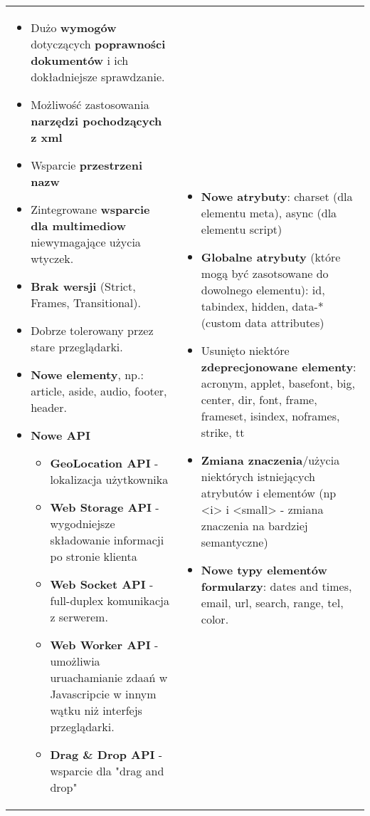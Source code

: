 \documentclass[../main.tex]{subfiles}
\begin{document}
    \begin{table}[H]
        \begin{center}
            \begin{tabular}{p{8cm} p{8cm}}
                \begin{itemize}
                    \item Dużo \textbf{wymogów} dotyczących \textbf{poprawności dokumentów} i ich dokładniejsze sprawdzanie.
                    \item Możliwość zastosowania \textbf{narzędzi pochodzących z xml}
                    \item Wsparcie \textbf{przestrzeni nazw}
                    \item Zintegrowane \textbf{wsparcie dla multimediow} niewymagające użycia wtyczek.
                    \item \textbf{Brak wersji} (Strict, Frames, Transitional).
                    \item Dobrze tolerowany przez stare przeglądarki.
                    \item \textbf{Nowe elementy}, np.: article, aside, audio, footer, header.

                    \item \textbf{Nowe API}
                    \begin{itemize}
                        \item \textbf{GeoLocation API} - lokalizacja użytkownika
                        \item \textbf{Web Storage API} - wygodniejsze składowanie informacji po stronie klienta
                        \item \textbf{Web Socket API} - full-duplex komunikacja z serwerem.
                        \item \textbf{Web Worker API} - umożliwia uruachamianie zdaań w Javascripcie w innym wątku niż interfejs przeglądarki.
                        \item \textbf{Drag \& Drop API} - wsparcie dla "drag and drop"
                    \end{itemize}
                \end{itemize}
                &
                \begin{itemize}
                    \item \textbf{Nowe atrybuty}: charset (dla elementu meta), async (dla elementu script)
                    \item \textbf{Globalne atrybuty} (które mogą być zasotsowane do dowolnego elementu): id, tabindex, hidden, data-* (custom data attributes)
                    \item Usunięto niektóre \textbf{zdeprecjonowane elementy}: acronym, applet, basefont, big, center, dir, font, frame, frameset, isindex, noframes, strike, tt
                    \item \textbf{Zmiana znaczenia}/użycia niektórych istniejących atrybutów i elementów (np <i> i <small> - zmiana znaczenia na bardziej semantyczne)
                    \item \textbf{Nowe typy elementów formularzy}: dates and times, email, url, search, range, tel, color.


\end{itemize}
\end{tabular}
\end{center}
\end{table}
\end{document}
